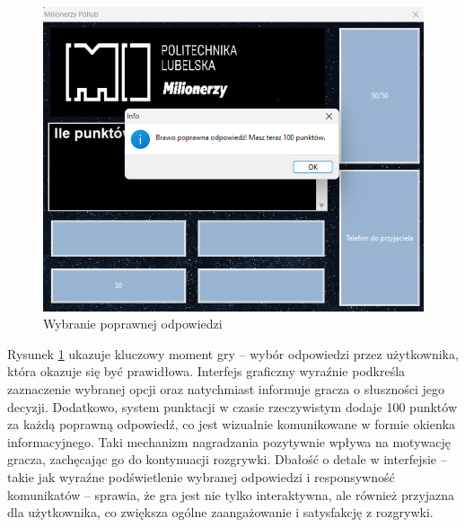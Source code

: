 \documentclass[]{article}
\begin{document}
	\begin{figure}[H]
		\centering
		\includegraphics[scale=0.3]{4.png}
		\caption{Wybranie poprawnej odpowiedzi}
		\label{rys:4}
	\end{figure}
Rysunek \ref{rys:4} ukazuje kluczowy moment gry – wybór odpowiedzi przez użytkownika, która okazuje się być prawidłowa. Interfejs graficzny wyraźnie podkreśla zaznaczenie wybranej opcji oraz natychmiast informuje gracza o słuszności jego decyzji. Dodatkowo, system punktacji w czasie rzeczywistym dodaje 100 punktów za każdą poprawną odpowiedź, co jest wizualnie komunikowane w formie okienka informacyjnego. Taki mechanizm nagradzania pozytywnie wpływa na motywację gracza, zachęcając go do kontynuacji rozgrywki. Dbałość o detale w interfejsie – takie jak wyraźne podświetlenie wybranej odpowiedzi i responsywność komunikatów – sprawia, że gra jest nie tylko interaktywna, ale również przyjazna dla użytkownika, co zwiększa ogólne zaangażowanie i satysfakcję z rozgrywki.
	
\end{document}
